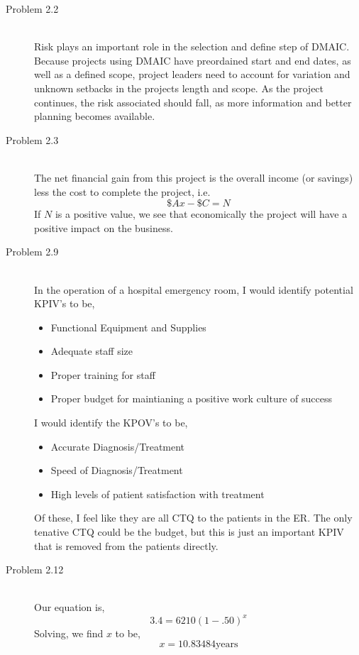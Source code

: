 \documentclass[letterpaper,10pt]{article}
\begin{document}
\begin{description}
\item[Problem 2.2]\hfill \\
Risk plays an important role in the selection and define step of DMAIC. Because projects using DMAIC have preordained start and end dates, as well as a defined scope, project leaders need to account for variation and unknown setbacks in the projects length and scope. As the project continues, the risk associated should fall, as more information and better planning becomes available.
\item[Problem 2.3]\hfill \\
The net financial gain from this project is the overall income (or savings) less the cost to complete the project, i.e.
\[\$Ax-\$C=N\]
If $N$ is a positive value, we see that economically the project will have a positive impact on the business.
\item[Problem 2.9]\hfill \\
In the operation of a hospital emergency room, I would identify potential KPIV's to be,
\begin{itemize}
\item Functional Equipment and Supplies
\item Adequate staff size
\item Proper training for staff
\item Proper budget for maintianing a positive work culture of success
\end{itemize}
I would identify the KPOV's to be,
\begin{itemize}
\item Accurate Diagnosis/Treatment
\item Speed of Diagnosis/Treatment
\item High levels of patient satisfaction with treatment
\end{itemize}
Of these, I feel like they are all CTQ to the patients in the ER. The only tenative CTQ could be the budget, but this is just an important KPIV that is removed from the patients directly.
\item[Problem 2.12]\hfill \\
Our equation is,
\[3.4=6210(1-.50)^x\]
Solving, we find $x$ to be,
\[x=10.83484\text{years}\]
\end{description}
\end{document}
